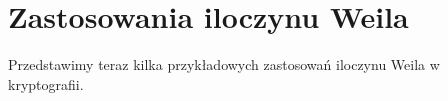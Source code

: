 \chapter{Zastosowania iloczynu Weila}

Przedstawimy teraz kilka przykładowych zastosowań
iloczynu Weila w kryptografii.






